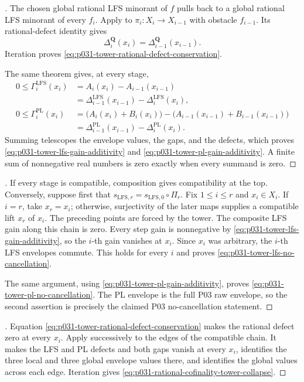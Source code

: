 
\begin{proof}[]
The chosen global rational LFS minorant of $f$ pulls back to a global
rational LFS minorant of every $f_i$.  Apply
 to
$\pi_i:X_i\to X_{i-1}$ with obstacle $f_{i-1}$.  Its rational-defect
identity gives
\[
 \Delta_i^{\mathbf Q}(x_i)=\Delta_{i-1}^{\mathbf Q}(x_{i-1}).
\]
Iteration proves \eqref{eq:p031-tower-rational-defect-conservation}.

The same theorem gives, at every stage,
\begin{align*}
 0\leq\Gamma_i^{\mathrm{LFS}}(x_i)
   &=A_i(x_i)-A_{i-1}(x_{i-1})\\
   &=\Delta_{i-1}^{\mathrm{LFS}}(x_{i-1})
       -\Delta_i^{\mathrm{LFS}}(x_i),\\
 0\leq\Gamma_i^{\mathrm{PL}}(x_i)
   &=\bigl(A_i(x_i)+B_i(x_i)\bigr)
       -\bigl(A_{i-1}(x_{i-1})+B_{i-1}(x_{i-1})\bigr)\\
   &=\Delta_{i-1}^{\mathrm{PL}}(x_{i-1})
       -\Delta_i^{\mathrm{PL}}(x_i).
\end{align*}
Summing telescopes the envelope values, the gaps, and the defects, which
proves
\eqref{eq:p031-tower-lfs-gain-additivity} and
\eqref{eq:p031-tower-pl-gain-additivity}.  A finite sum of nonnegative real
numbers is zero exactly when every summand is zero.
\end{proof}

\begin{proof}[]
If every stage is compatible, composition gives compatibility at the top.
Conversely, suppose first that
$s_{\mathrm{LFS},r}=s_{\mathrm{LFS},0}\circ\Pi_r$.  Fix
$1\leq i\leq r$ and $x_i\in X_i$.  If $i=r$, take $x_r=x_i$; otherwise,
surjectivity of the later maps supplies a compatible lift $x_r$ of $x_i$.
The preceding points are forced by the tower.  The composite LFS gain along
this chain is zero.  Every step gain is
nonnegative by
\eqref{eq:p031-tower-lfs-gain-additivity}, so the $i$-th gain vanishes at
$x_i$.  Since $x_i$ was arbitrary, the $i$-th LFS envelopes commute.  This
holds for every $i$ and proves
\eqref{eq:p031-tower-lfs-no-cancellation}.

The same argument, using
\eqref{eq:p031-tower-pl-gain-additivity}, proves
\eqref{eq:p031-tower-pl-no-cancellation}.  The PL envelope is the full P03
raw envelope, so the second assertion is precisely the claimed P03
no-cancellation statement.
\end{proof}

\begin{proof}[]
Equation \eqref{eq:p031-tower-rational-defect-conservation} makes the rational
defect zero at every $x_i$.  Apply
 successively to the edges
of the compatible chain.  It makes the LFS and PL defects and both gaps
vanish at every $x_i$, identifies the three local and three global envelope
values there, and identifies the global values across each edge.  Iteration
gives \eqref{eq:p031-rational-cofinality-tower-collapse}.
\end{proof}
